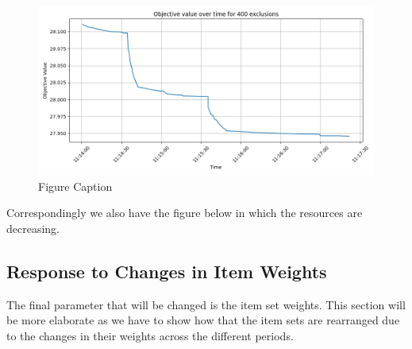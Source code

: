 \documentclass[preprint,12pt,authoryear]{elsarticle}
\begin{document}
\begin{figure}[H]%
\centering%
\includegraphics[width=1.0\textwidth]{figures/objective-resource-increases.png}
\caption{Figure Caption}\label{fig:objective-resource-increases}
\end{figure}

Correspondingly we also have the figure below in which the resources are decreasing.

\subsection{Response to Changes in Item Weights}
The final parameter that will be changed is the item set weights. This section will be more elaborate as we have to show how that the item sets are rearranged due to the changes in their weights across the different periods.
\end{document}
